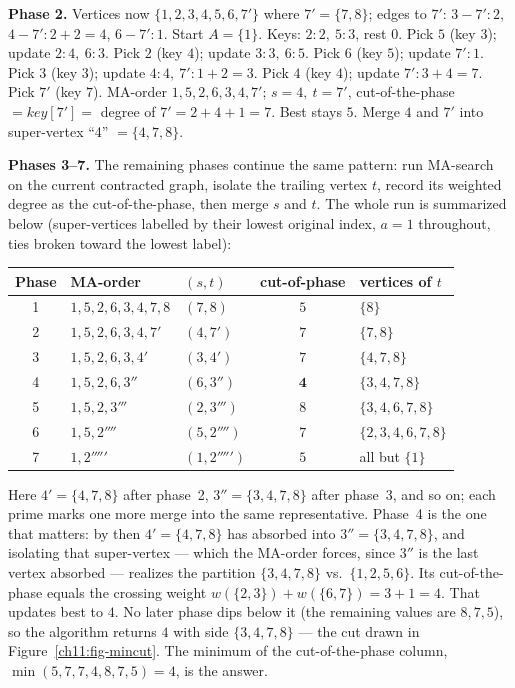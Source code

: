 \textbf{Phase 2.} Vertices now $\{1,2,3,4,5,6,7'\}$ where $7'=\{7,8\}$; edges to $7'$: $3{-}7'{:}2$, $4{-}7'{:}2{+}2{=}4$, $6{-}7'{:}1$. Start $A=\{1\}$. Keys: $2{:}2,\ 5{:}3$, rest $0$. Pick $5$ (key $3$); update $2{:}4,\ 6{:}3$. Pick $2$ (key $4$); update $3{:}3,\ 6{:}5$. Pick $6$ (key $5$); update $7'{:}1$. Pick $3$ (key $3$); update $4{:}4,\ 7'{:}1{+}2{=}3$. Pick $4$ (key $4$); update $7'{:}3{+}4{=}7$. Pick $7'$ (key $7$). MA-order $1,5,2,6,3,4,7'$; $s=4,\ t=7'$, cut-of-the-phase $=\textit{key}[7']=$ degree of $7'=2+4+1=7$. Best stays $5$. Merge $4$ and $7'$ into super-vertex ``4'' $=\{4,7,8\}$.

\textbf{Phases 3--7.} The remaining phases continue the same pattern: run MA-search on the current contracted graph, isolate the trailing vertex $t$, record its weighted degree as the cut-of-the-phase, then merge $s$ and $t$. The whole run is summarized below (super-vertices labelled by their lowest original index, $a=1$ throughout, ties broken toward the lowest label):

\begin{center}
\begin{tabular}{cllcl}
\toprule
Phase & MA-order & $(s,t)$ & cut-of-phase & vertices of $t$ \\
\midrule
1 & $1,5,2,6,3,4,7,8$       & $(7,8)$   & $5$          & $\{8\}$ \\
2 & $1,5,2,6,3,4,7'$        & $(4,7')$  & $7$          & $\{7,8\}$ \\
3 & $1,5,2,6,3,4'$          & $(3,4')$  & $7$          & $\{4,7,8\}$ \\
4 & $1,5,2,6,3''$           & $(6,3'')$ & $\mathbf{4}$ & $\{3,4,7,8\}$ \\
5 & $1,5,2,3'''$            & $(2,3''')$& $8$          & $\{3,4,6,7,8\}$ \\
6 & $1,5,2''''$             & $(5,2'''')$& $7$         & $\{2,3,4,6,7,8\}$ \\
7 & $1,2'''''$              & $(1,2''''')$& $5$        & all but $\{1\}$ \\
\bottomrule
\end{tabular}
\end{center}

Here $4'=\{4,7,8\}$ after phase~2, $3''=\{3,4,7,8\}$ after phase~3, and so on; each prime marks one more merge into the same representative. Phase~4 is the one that matters: by then $4'=\{4,7,8\}$ has absorbed into $3''=\{3,4,7,8\}$, and isolating that super-vertex --- which the MA-order forces, since $3''$ is the last vertex absorbed --- realizes the partition $\{3,4,7,8\}$ vs.\ $\{1,2,5,6\}$. Its cut-of-the-phase equals the crossing weight $w(\{2,3\})+w(\{6,7\})=3+1=4$. That updates best to $4$. No later phase dips below it (the remaining values are $8,7,5$), so the algorithm returns $4$ with side $\{3,4,7,8\}$ --- the cut drawn in Figure~\ref{ch11:fig-mincut}. The minimum of the cut-of-the-phase column, $\min(5,7,7,4,8,7,5)=4$, is the answer.

